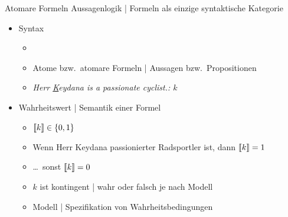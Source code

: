 \begin{frame}
  {Atomare Formeln}
  \onslide<+->
  \onslide<+->
  Aussagenlogik | \alert{Formeln} als einzige syntaktische Kategorie\\
  \Halbzeile
  \begin{itemize}[<+->]
    \item Syntax
      \begin{itemize}[<+->]
        \item {}
        \item \alert{Atome} bzw.\ \alert{atomare Formeln} | Aussagen bzw.\ Propositionen
        \item \it{Herr \underline{K}eydana is a passionate cyclist.}: $k$
      \end{itemize}
      \Halbzeile
    \item \alert{Wahrheitswert} | Semantik einer Formel
      \begin{itemize}[<+->]
        \item ${\llbracket{}k\rrbracket}\in\{0,1\}$
        \item Wenn Herr Keydana passionierter Radsportler ist, dann ${\llbracket{}k\rrbracket}=1$
        \item \ldots\ sonst ${\llbracket{}k\rrbracket}=0$
        \item $k$ ist \alert{kontingent} | wahr oder falsch je nach \alert{Modell}
        \item Modell | Spezifikation von Wahrheitsbedingungen
      \end{itemize}
  \end{itemize}
\end{frame}

